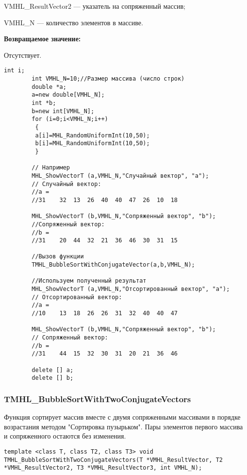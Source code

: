 \documentclass[a4paper,12pt]{article}
\begin{document}
VMHL\_ResultVector2 --- указатель на сопряженный массив;
 
VMHL\_N --- количество элементов в массиве.

\textbf{Возвращаемое значение:}

Отсутствует.


\begin{lstlisting}[label=code_use_TMHL_BubbleSortWithConjugateVector,caption=Пример использования]
        int i;
        int VMHL_N=10;//Размер массива (число строк)
        double *a;
        a=new double[VMHL_N];
        int *b;
        b=new int[VMHL_N];
        for (i=0;i<VMHL_N;i++)
         {
         a[i]=MHL_RandomUniformInt(10,50);
         b[i]=MHL_RandomUniformInt(10,50);
         }

        // Например
        MHL_ShowVectorT (a,VMHL_N,"Случайный вектор", "a");
        // Случайный вектор:
        //a =
        //31	32	13	26	40	40	47	26	10	18

        MHL_ShowVectorT (b,VMHL_N,"Сопряженный вектор", "b");
        //Сопряженный вектор:
        //b =
        //31	20	44	32	21	36	46	30	31	15

        //Вызов функции
        TMHL_BubbleSortWithConjugateVector(a,b,VMHL_N);

        //Используем полученный результат
        MHL_ShowVectorT (a,VMHL_N,"Отсортированный вектор", "a");
        // Отсортированный вектор:
        //a =
        //10	13	18	26	26	31	32	40	40	47

        MHL_ShowVectorT (b,VMHL_N,"Сопряженный вектор", "b");
        // Сопряженный вектор:
        //b =
        //31	44	15	32	30	31	20	21	36	46

        delete [] a;
        delete [] b;
\end{lstlisting}

\subsubsection{TMHL\_BubbleSortWithTwoConjugateVectors}\label{TMHL_BubbleSortWithTwoConjugateVectors}

Функция сортирует массив вместе с двумя сопряженными массивами в порядке возрастания методом "Сортировка пузырьком". Пары элементов первого массива и сопряженного остаются без изменения.


\begin{lstlisting}[label=code_syntax_TMHL_BubbleSortWithTwoConjugateVectors,caption=Синтаксис]
template <class T, class T2, class T3> void TMHL_BubbleSortWithTwoConjugateVectors(T *VMHL_ResultVector, T2 *VMHL_ResultVector2, T3 *VMHL_ResultVector3, int VMHL_N);
\end{lstlisting}
\end{document}
